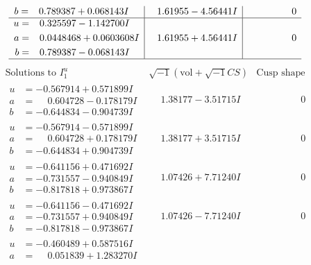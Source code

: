 \documentclass[1p]{elsarticle_modified}
\theoremstyle{definition}
\newcommand{\I}{\sqrt{-1}}
\begin{document}
$$\begin{array}{c|c|c}
\begin{aligned}
b &= \phantom{-}0.789387 + 0.068143 I\end{aligned}
 & \phantom{-}1.61955 - 4.56441 I & \phantom{-0.000000 } 0 \\ \hline\begin{aligned}
u &= \phantom{-}0.325597 - 1.142700 I \\
a &= \phantom{-}0.0448468 + 0.0603608 I \\
b &= \phantom{-}0.789387 - 0.068143 I\end{aligned}
 & \phantom{-}1.61955 + 4.56441 I & \phantom{-0.000000 } 0\\
 \hline 
 \end{array}$$\newpage$$\begin{array}{c|c|c}  
\text{Solutions to }I^u_{1}& \I (\text{vol} + \sqrt{-1}CS) & \text{Cusp shape}\\
 \hline 
\begin{aligned}
u &= -0.567914 + 0.571899 I \\
a &= \phantom{-}0.604728 - 0.178179 I \\
b &= -0.644834 - 0.904739 I\end{aligned}
 & \phantom{-}1.38177 - 3.51715 I & \phantom{-0.000000 } 0 \\ \hline\begin{aligned}
u &= -0.567914 - 0.571899 I \\
a &= \phantom{-}0.604728 + 0.178179 I \\
b &= -0.644834 + 0.904739 I\end{aligned}
 & \phantom{-}1.38177 + 3.51715 I & \phantom{-0.000000 } 0 \\ \hline\begin{aligned}
u &= -0.641156 + 0.471692 I \\
a &= -0.731557 - 0.940849 I \\
b &= -0.817818 + 0.973867 I\end{aligned}
 & \phantom{-}1.07426 + 7.71240 I & \phantom{-0.000000 } 0 \\ \hline\begin{aligned}
u &= -0.641156 - 0.471692 I \\
a &= -0.731557 + 0.940849 I \\
b &= -0.817818 - 0.973867 I\end{aligned}
 & \phantom{-}1.07426 - 7.71240 I & \phantom{-0.000000 } 0 \\ \hline\begin{aligned}
u &= -0.460489 + 0.587516 I \\
a &= \phantom{-}0.051839 + 1.283270 I \\

\end{aligned}
\end{array}$$
\end{document}
